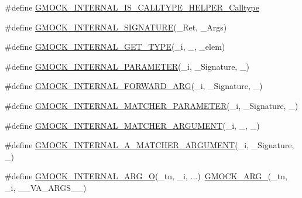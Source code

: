 \begin{DoxyCompactItemize}
\item 
\#define \mbox{\hyperlink{googletest-master_2googlemock_2include_2gmock_2gmock-function-mocker_8h_a0968a7caf74c01e48f4ec5596dcbd055}{G\+M\+O\+C\+K\+\_\+\+I\+N\+T\+E\+R\+N\+A\+L\+\_\+\+I\+S\+\_\+\+C\+A\+L\+L\+T\+Y\+P\+E\+\_\+\+H\+E\+L\+P\+E\+R\+\_\+\+Calltype}}
\item 
\#define \mbox{\hyperlink{googletest-master_2googlemock_2include_2gmock_2gmock-function-mocker_8h_a0a88ee90715376da8743924b64818ff0}{G\+M\+O\+C\+K\+\_\+\+I\+N\+T\+E\+R\+N\+A\+L\+\_\+\+S\+I\+G\+N\+A\+T\+U\+RE}}(\+\_\+\+Ret,  \+\_\+\+Args)
\item 
\#define \mbox{\hyperlink{googletest-master_2googlemock_2include_2gmock_2gmock-function-mocker_8h_a18563a68cd9e8061ee75ee68f2c74c37}{G\+M\+O\+C\+K\+\_\+\+I\+N\+T\+E\+R\+N\+A\+L\+\_\+\+G\+E\+T\+\_\+\+T\+Y\+PE}}(\+\_\+i,  \+\_\+,  \+\_\+elem)
\item 
\#define \mbox{\hyperlink{googletest-master_2googlemock_2include_2gmock_2gmock-function-mocker_8h_ae7abd49050035332eb2572ab2ff1472e}{G\+M\+O\+C\+K\+\_\+\+I\+N\+T\+E\+R\+N\+A\+L\+\_\+\+P\+A\+R\+A\+M\+E\+T\+ER}}(\+\_\+i,  \+\_\+\+Signature,  \+\_\+)
\item 
\#define \mbox{\hyperlink{googletest-master_2googlemock_2include_2gmock_2gmock-function-mocker_8h_a5ab1c90c3089a1b825ef70fa0273e463}{G\+M\+O\+C\+K\+\_\+\+I\+N\+T\+E\+R\+N\+A\+L\+\_\+\+F\+O\+R\+W\+A\+R\+D\+\_\+\+A\+RG}}(\+\_\+i,  \+\_\+\+Signature,  \+\_\+)
\item 
\#define \mbox{\hyperlink{googletest-master_2googlemock_2include_2gmock_2gmock-function-mocker_8h_a2d8d1ef12c162a39811ce0b14a3f8979}{G\+M\+O\+C\+K\+\_\+\+I\+N\+T\+E\+R\+N\+A\+L\+\_\+\+M\+A\+T\+C\+H\+E\+R\+\_\+\+P\+A\+R\+A\+M\+E\+T\+ER}}(\+\_\+i,  \+\_\+\+Signature,  \+\_\+)
\item 
\#define \mbox{\hyperlink{googletest-master_2googlemock_2include_2gmock_2gmock-function-mocker_8h_ae1197367da885151c2834b92e0f5b123}{G\+M\+O\+C\+K\+\_\+\+I\+N\+T\+E\+R\+N\+A\+L\+\_\+\+M\+A\+T\+C\+H\+E\+R\+\_\+\+A\+R\+G\+U\+M\+E\+NT}}(\+\_\+i,  \+\_,  \+\_)
\item 
\#define \mbox{\hyperlink{googletest-master_2googlemock_2include_2gmock_2gmock-function-mocker_8h_ab124145546366f2495dc81c5ba3ed541}{G\+M\+O\+C\+K\+\_\+\+I\+N\+T\+E\+R\+N\+A\+L\+\_\+\+A\+\_\+\+M\+A\+T\+C\+H\+E\+R\+\_\+\+A\+R\+G\+U\+M\+E\+NT}}(\+\_\+i,  \+\_\+\+Signature,  \+\_\+)
\item 
\#define \mbox{\hyperlink{googletest-master_2googlemock_2include_2gmock_2gmock-function-mocker_8h_ab154749bfdbffeaca0877adaa73c2232}{G\+M\+O\+C\+K\+\_\+\+I\+N\+T\+E\+R\+N\+A\+L\+\_\+\+A\+R\+G\+\_\+O}}(\+\_\+tn,  \+\_\+i, ...)~\mbox{\hyperlink{_obj__test_2lib_2googletest-release-1_88_81_2googlemock_2include_2gmock_2gmock-generated-function-mockers_8h_a887575cc1c31158fba808180a10c004f}{G\+M\+O\+C\+K\+\_\+\+A\+R\+G\+\_\+}}(\+\_\+tn, \+\_\+i, \+\_\+\+\_\+\+V\+A\+\_\+\+A\+R\+G\+S\+\_\+\+\_\+)

\end{DoxyCompactItemize}
